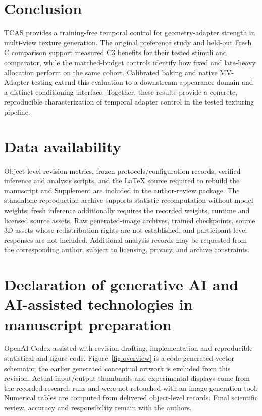 \documentclass[times,twocolumn,final]{elsarticle}
\begin{document}
\section{Conclusion}
\label{sec:conclusion}
TCAS provides a training-free temporal control for geometry-adapter strength in multi-view texture generation. The original preference study and held-out Fresh C comparison support measured C3 benefits for their tested stimuli and comparator, while the matched-budget controls identify how fixed and late-heavy allocation perform on the same cohort. Calibrated baking and native MV-Adapter testing extend this evaluation to a downstream appearance domain and a distinct conditioning interface. Together, these results provide a concrete, reproducible characterization of temporal adapter control in the tested texturing pipeline.

\section*{Data availability}

Object-level revision metrics, frozen protocols/configuration records, verified inference and analysis scripts, and the LaTeX source required to rebuild the manuscript and Supplement are included in the author-review package. The standalone reproduction archive supports statistic recomputation without model weights; fresh inference additionally requires the recorded weights, runtime and licensed source assets. Raw generated-image archives, trained checkpoints, source 3D assets whose redistribution rights are not established, and participant-level responses are not included. Additional analysis records may be requested from the corresponding author, subject to licensing, privacy, and archive constraints.

\section*{Declaration of generative AI and AI-assisted technologies in manuscript preparation}
OpenAI Codex assisted with revision drafting, implementation and reproducible statistical and figure code. Figure~\ref{fig:overview} is a code-generated vector schematic; the earlier generated conceptual artwork is excluded from this revision. Actual input/output thumbnails and experimental displays come from the recorded research runs and were not retouched with an image-generation tool. Numerical tables are computed from delivered object-level records. Final scientific review, accuracy and responsibility remain with the authors.
\end{document}
